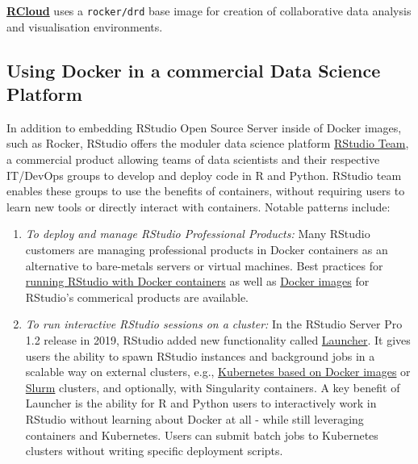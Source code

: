 \textbf{\href{https://github.com/att/rcloud/tree/master/docker}{RCloud}}
uses a \texttt{rocker/drd} base image for creation of collaborative data
analysis and visualisation environments.

\hypertarget{using-docker-in-a-commercial-data-science-platform}{%
\subsection{Using Docker in a commercial Data Science
Platform}\label{using-docker-in-a-commercial-data-science-platform}}

In addition to embedding RStudio Open Source Server inside of Docker
images, such as Rocker, RStudio offers the moduler data science platform
\href{https://rstudio.com/products/team/}{RStudio Team}, a commercial
product allowing teams of data scientists and their respective IT/DevOps
groups to develop and deploy code in R and Python. RStudio team enables
these groups to use the benefits of containers, without requiring users
to learn new tools or directly interact with containers. Notable
patterns include:

\begin{enumerate}
\def\labelenumi{\arabic{enumi}.}
\tightlist
\item
  \emph{To deploy and manage RStudio Professional Products:} Many
  RStudio customers are managing professional products in Docker
  containers as an alternative to bare-metals servers or virtual
  machines. Best practices for
  \href{https://support.rstudio.com/hc/en-us/articles/360021594513-Running-RStudio-with-Docker-containers}{running
  RStudio with Docker containers} as well as
  \href{https://github.com/rstudio/rstudio-docker-products}{Docker
  images} for RStudio's commerical products are available.
\item
  \emph{To run interactive RStudio sessions on a cluster:} In the
  RStudio Server Pro 1.2 release in 2019, RStudio added new
  functionality called
  \href{https://solutions.rstudio.com/launcher/overview/}{Launcher}. It
  gives users the ability to spawn RStudio instances and background jobs
  in a scalable way on external clusters, e.g.,
  \href{https://support.rstudio.com/hc/en-us/articles/360019253393-Using-Docker-images-with-RStudio-Server-Pro-Launcher-and-Kubernetes}{Kubernetes
  based on Docker images} or \href{https://slurm.schedmd.com/}{Slurm}
  clusters, and optionally, with Singularity containers. A key benefit
  of Launcher is the ability for R and Python users to interactively
  work in RStudio without learning about Docker at all - while still
  leveraging containers and Kubernetes. Users can submit batch jobs to
  Kubernetes clusters without writing specific deployment scripts.
\end{enumerate}

